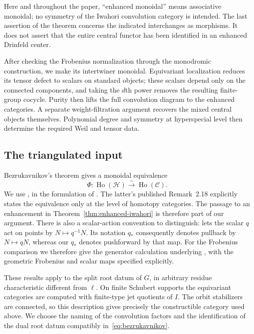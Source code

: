 \documentclass[11pt]{article}
\numberwithin{equation}{section}
\theoremstyle{definition}
\theoremstyle{remark}
\begin{document}
Here and throughout the paper, ``enhanced monoidal'' means associative
monoidal; no symmetry of the Iwahori convolution category is intended.
The last assertion of the theorem concerns the indicated interchanges
as morphisms.  It does not assert that the entire central functor has
been identified in an enhanced Drinfeld center.

After checking the Frobenius normalization through the monodromic
construction, we make its intertwiner monoidal.  Equivariant localization
reduces its tensor defect to scalars on standard objects;
these scalars depend only on the connected components, and taking the
$d$th power removes the resulting finite-group cocycle.  Purity then
lifts the full convolution diagram to the enhanced categories.  A
separate weight-filtration argument recovers the mixed central objects
themselves.  Polynomial degree and symmetry at hyperspecial level
then determine the required Weil and tensor data.

\subsection{The triangulated input}

Bezrukavnikov's theorem gives a monoidal equivalence
\begin{equation}\label{eq:bezrukavnikov}
 \Phi:\operatorname{Ho}(\mathscr H)
       \xrightarrow{\ \sim\ }
       \operatorname{Ho}(\mathscr C).
\end{equation}
We use \cite[Theorem~1 and Section~10]{Enh:Bezrukavnikov},
in the formulation of
\cite[Theorems~1.13 and~2.17]{Local:BZCHN}.
The latter's published Remark~2.18 explicitly states the equivalence only at the level
of homotopy categories.  The passage to an enhancement in
Theorem~\ref{thm:enhanced-iwahori} is therefore part of our argument.
There is also a scalar-action convention to distinguish:
\cite[Section~1.6.3, note~8, and Section~2.4.1]{Local:BZCHN}
lets the scalar $q$ act on points by $N\mapsto q^{-1}N$.
Its notation $q_*$ consequently denotes pullback by $N\mapsto qN$,
whereas our $q_*$ denotes pushforward by that map.
For the Frobenius comparison we therefore give the generator
calculation underlying \cite[Proposition~53]{Enh:Bezrukavnikov},
with the geometric Frobenius and scalar maps specified explicitly.

These results apply to the split root datum of $G$, in arbitrary
residue characteristic different from $\ell$.  On finite Schubert
supports the equivariant categories are computed with finite-type
jet quotients of $I$.  The orbit stabilizers are connected, so this
description gives precisely the constructible category used above.
We choose the naming of the convolution factors and the identification
of the dual root datum compatibly in~\eqref{eq:bezrukavnikov}.
\end{document}
